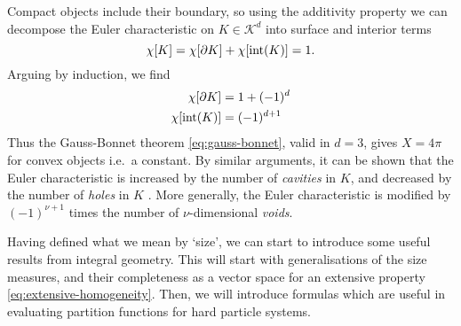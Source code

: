Compact objects include their boundary, so using the additivity property we can decompose the Euler characteristic on $K \in \mathcal{K}^d$ into surface and interior terms
\begin{equation*}
  \chi[K] = \chi[ \partial K ] + \chi[ \operatorname{int}(K) ] = 1.
\end{equation*}
Arguing by induction, we find%
\begin{subequations}
  \begin{align}
    \chi[ \partial K ] &= 1 + (-1)^d
    \\
    \chi[ \operatorname{int}(K) ] &= (-1)^{d+1}
  \end{align}
\end{subequations}
Thus the Gauss-Bonnet theorem \eqref{eq:gauss-bonnet}, valid in $d=3$, gives $X = 4\pi$ for convex objects i.e.\ a constant.
By similar arguments, it can be shown that the Euler characteristic is increased by the number of \emph{cavities} in $K$, and decreased by the number of \emph{holes} in $K$ \cite{Klain1997}.
More generally, the Euler characteristic is modified by $(-1)^{\nu+1}$ times the number of $\nu$-dimensional \emph{voids}.




Having defined what we mean by `size', we can start to introduce some useful results from integral geometry.
This will start with generalisations of the size measures, and their completeness as a vector space for an extensive property \eqref{eq:extensive-homogeneity}.
Then, we will introduce formulas which are useful in evaluating partition functions for hard particle systems.

